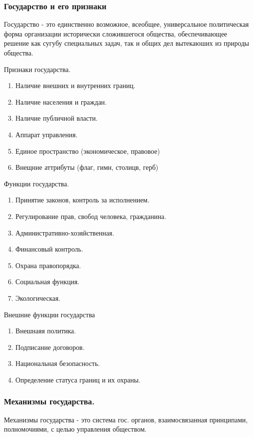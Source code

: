 \documentclass{article}
\begin{document}
\subsubsection{Государство и его признаки}
Государство - это единственно возможное, всеобщее, универсальное политическая форма организации
исторически сложившегося общества, обеспечивающее решение как сугубу специальных задач,
так и общих дел вытекаюших из природы общества.

Признаки государства.
\begin{enumerate}
    \item Наличие внешних и внутренних границ.
    \item Наличие населения и граждан.
    \item Наличие публичной власти.
    \item Аппарат управления.
    \item Единое пространство (экономическое, правовое)
    \item Внещние аттрибуты (флаг, гимн, столицв, герб)
\end{enumerate}

 Функции государства.
\begin{enumerate}
    \item Принятие законов, контроль за исполнением.
    \item Регулирование прав, свобод человека, гражданина.
    \item Административно-хозяйственная.
    \item Финансовый контроль.
    \item Охрана правопорядка.
    \item Социальная функция.
    \item Экологическая.
\end{enumerate}

Внешние функции государства
\begin{enumerate}
    \item Внешнаяя политика.
    \item Подписание договоров.
    \item Национальная безопасность.
    \item Определение статуса границ и их охраны.
\end{enumerate}
\subsubsection{Механизмы государства.}

Механизмы государства - это система гос. органов, взаимосвязанная принципами, полномочиями, 
с целью управления обществом.
\end{document}
